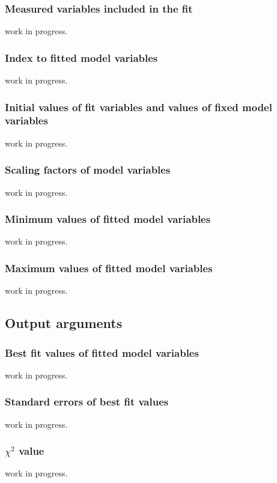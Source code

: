 \documentclass[12pt]{article}
\begin{document}
\subsubsection{Measured variables included in the fit}
work in progress.

\subsubsection{Index to fitted model variables}
work in progress.

\subsubsection{Initial values of fit variables and values of fixed model variables}
work in progress.

\subsubsection{Scaling factors of model variables}
work in progress.

\subsubsection{Minimum values of fitted model variables}
work in progress.

\subsubsection{Maximum values of fitted model variables}
work in progress.


\subsection{Output arguments}\label{sec:outputargs}

\subsubsection{Best fit values of fitted model variables}
work in progress.

\subsubsection{Standard errors of best fit values}
work in progress.

\subsubsection{$\chi^2$ value}
work in progress.
\end{document}
